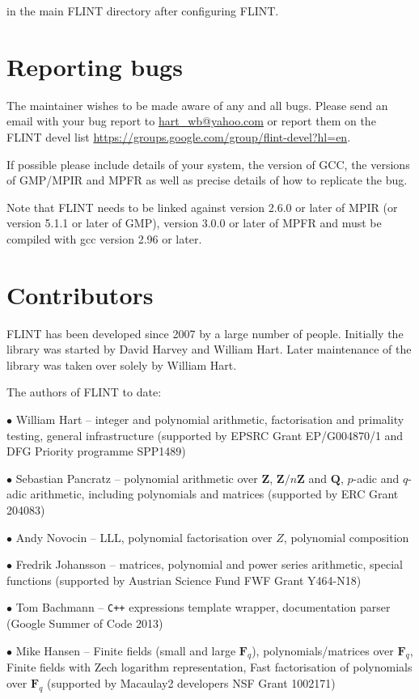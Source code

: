 \documentclass[a4paper,10pt]{book}
\newcommand{\Z}{\mathbf{Z}}%
\newcommand{\Q}{\mathbf{Q}}%
\newcommand{\F}{\mathbf{F}}%
\newcommand{\code}{\lstinline}
\begin{document}
in the main FLINT directory after configuring FLINT.

\chapter{Reporting bugs}

The maintainer wishes to be made aware of any and all bugs.  Please send an
email with your bug report to \url{hart_wb@yahoo.com} or report them on the
FLINT devel list \url{https://groups.google.com/group/flint-devel?hl=en}.

If possible please include details of your system, the version of GCC,
the versions of GMP/MPIR and MPFR as well as precise details of how to
replicate the bug.

Note that FLINT needs to be linked against version 2.6.0 or later of MPIR
(or version 5.1.1 or later of GMP), version 3.0.0 or later of MPFR and
must be compiled with gcc version 2.96 or later.

\chapter{Contributors}

FLINT has been developed since 2007 by a large number of people. Initially
the library was started by David Harvey and William Hart. Later maintenance
of the library was taken over solely by William Hart.

The authors of FLINT to date:

$\bullet$ William Hart -- integer and polynomial arithmetic, factorisation and
primality testing, general infrastructure (supported by EPSRC Grant
EP/G004870/1 and DFG Priority programme SPP1489)

$\bullet$ Sebastian Pancratz -- polynomial arithmetic over $\Z$, $\Z/n\Z$ and
$\Q$, $p$-adic and $q$-adic arithmetic, including polynomials and matrices
(supported by ERC Grant 204083)

$\bullet$ Andy Novocin -- LLL, polynomial factorisation over $Z$, polynomial
composition

$\bullet$ Fredrik Johansson -- matrices, polynomial and power series
arithmetic, special functions (supported by Austrian Science Fund FWF Grant
Y464-N18)

$\bullet$ Tom Bachmann -- \code{C++} expressions template wrapper,
documentation parser (Google Summer of Code 2013)

$\bullet$ Mike Hansen -- Finite fields (small and large $\F_q$),
polynomials/matrices over $\F_q$, Finite fields with Zech logarithm
representation, Fast factorisation of polynomials over $\F_q$ (supported by
Macaulay2 developers NSF Grant 1002171)
\end{document}
